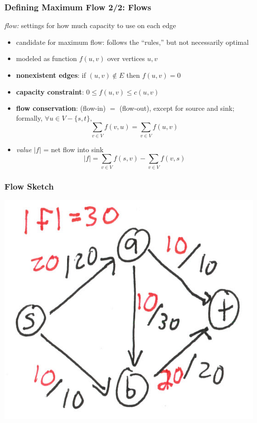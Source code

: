 \documentclass[10pt,aspectratio=169]{beamer}
\begin{document}
\begin{frame} \frametitle{Defining Maximum Flow 2/2: Flows}
\emph{flow:} settings for how much capacity to use on each edge
\begin{itemize}
  \item candidate for maximum flow: follows the ``rules,'' but not necessarily
    optimal
  \item modeled as function $f(u, v)$ over vertices $u, v$
  \item \textbf{nonexistent edges}: if $(u, v) \notin E$ then $f(u, v) = 0$
  \item \textbf{capacity constraint}: $0 \leq f(u, v) \leq c(u, v)$
  \item \textbf{flow conservation}: (flow-in) $=$ (flow-out), except for source and
    sink; formally, $\forall u \in V - \{s, t\},$
    \[ \sum_{v \in V} f(v, u) = \sum_{v \in V} f(u, v) \]
  \item \emph{value} $|f|$ = net flow into sink
    \[ |f| = \sum_{v \in V} f(s, v) - \sum_{v \in V} f(v, s) \]
\end{itemize}
\end{frame}

\begin{frame} \frametitle{Flow Sketch}
\begin{center}
  \includegraphics{flow-example.png}
\end{center}
\end{frame}
\end{document}
